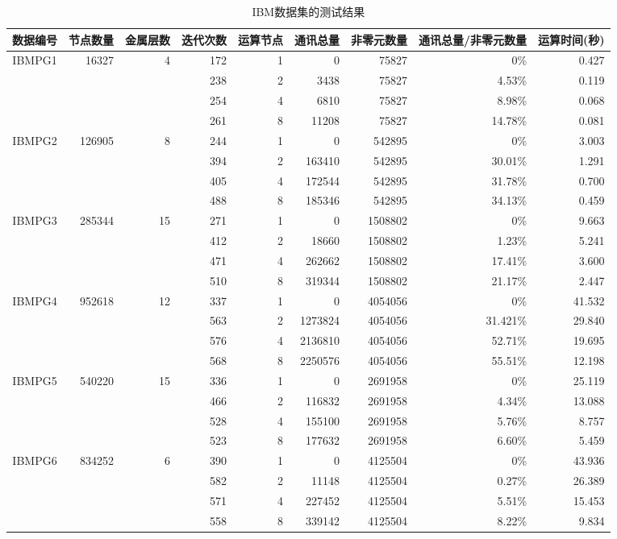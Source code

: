 \begin{sidewaystable}[htbp]
\centering
\caption{IBM数据集的测试结果}
\label{tab:tabibmresult}
\begin{tabular}{c|r|r|r|r|r|r|r|r}
\toprule[1.5pt]
\hline
数据编号 & 节点数量 & 金属层数 & 迭代次数 & 运算节点 & 通讯总量 & 非零元数量 & 通讯总量/非零元数量 & 运算时间(秒)  \\
\hline
IBMPG1 & 16327 & 4  & 172  & 1  &  0 & 75827 & 0\% & 0.427\\
\hline
& & & 238 & 2 & 3438 & 75827 & 4.53\% & 0.119 \\
\hline
& & & 254 & 4 & 6810 & 75827 &  8.98\% &  0.068 \\
\hline
& & & 261 & 8 & 11208 & 75827 & 14.78\% & 0.081 \\
\hline
IBMPG2 & 126905 & 8 & 244 & 1 & 0 & 542895 & 0\% & 3.003 \\
\hline
& & & 394 & 2 & 163410 & 542895 & 30.01\% & 1.291 \\
\hline
& & & 405 & 4 & 172544 & 542895 & 31.78\% &  0.700 \\
\hline
& & & 488 & 8 & 185346 & 542895 & 34.13\% & 0.459 \\
\hline
IBMPG3 & 285344 & 15 & 271 & 1 & 0 & 1508802 & 0\% & 9.663 \\
\hline
& & & 412 & 2 & 18660 & 1508802 & 1.23\% & 5.241 \\
\hline
& & & 471 & 4 & 262662 & 1508802 & 17.41\% & 3.600 \\
\hline
& & & 510 & 8 & 319344 & 1508802 & 21.17\% & 2.447 \\
\hline
IBMPG4 & 952618 & 12 & 337 & 1 & 0 & 4054056 & 0\% & 41.532 \\
\hline
& & & 563 & 2 & 1273824 & 4054056 & 31.421\% & 29.840 \\
\hline
& & & 576 & 4 & 2136810 & 4054056 & 52.71\% & 19.695 \\
\hline
& & & 568 & 8 & 2250576 & 4054056 & 55.51\% & 12.198 \\
\hline
IBMPG5 & 540220 & 15 & 336 & 1 & 0 & 2691958 & 0\% & 25.119 \\
\hline
& & & 466 & 2 & 116832 & 2691958 & 4.34\% & 13.088 \\
\hline
& & & 528 & 4 & 155100 & 2691958 & 5.76\% & 8.757 \\
\hline
& & & 523 & 8 & 177632 & 2691958 & 6.60\% & 5.459 \\
\hline
IBMPG6 & 834252 & 6 & 390 & 1 & 0 & 4125504 & 0\% & 43.936 \\
\hline
& & & 582 & 2 & 11148 & 4125504 & 0.27\% & 26.389 \\
\hline
& & & 571 & 4 & 227452 & 4125504 & 5.51\% & 15.453 \\
\hline
& & & 558 & 8 & 339142 & 4125504 & 8.22\% & 9.834 \\
\hline
\end{tabular}
\end{sidewaystable}

